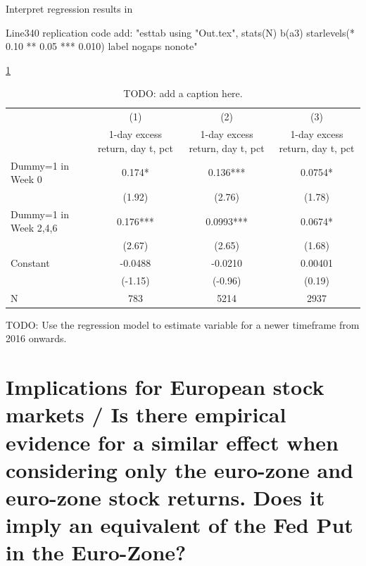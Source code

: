 Interpret regression results in  \parencite{cieslak_stock_2019}

Line340 replication code add:
"esttab using "Out.tex", stats(N) b(a3) starlevels(*  0.10 ** 0.05 *** 0.010) label nogaps nonote"

{


\ref{table_cies19_1}
\begin{table}
\begin{center}
\begin{adjustbox}{width=1\textwidth}
\def\sym#1{\ifmmode^{#1}\else\(^{#1}\)\fi}
\begin{tabular}{l*{3}{c}}

\hline\hline
                    &\multicolumn{1}{c}{(1)}&\multicolumn{1}{c}{(2)}&\multicolumn{1}{c}{(3)}\\
                    &\multicolumn{1}{c}{1-day excess return, day t, pct}&\multicolumn{1}{c}{1-day excess return, day t, pct}&\multicolumn{1}{c}{1-day excess return, day t, pct}\\
\hline
Dummy=1 in Week 0   &       0.174*  &       0.136***&      0.0754*  \\
                    &      (1.92)   &      (2.76)   &      (1.78)   \\
Dummy=1 in Week 2,4,6&       0.176***&      0.0993***&      0.0674*  \\
                    &      (2.67)   &      (2.65)   &      (1.68)   \\
Constant            &     -0.0488   &     -0.0210   &     0.00401   \\
                    &     (-1.15)   &     (-0.96)   &      (0.19)   \\
\hline
N                   &         783   &        5214   &        2937   \\
\hline\hline

\end{tabular}
\end{adjustbox}
\caption{\label{table_cies19_1}TODO: add a caption here.}
\end{center}
\end{table}

}




TODO: Use the regression model to estimate variable for a newer timeframe from 2016 onwards.

\chapter{Implications for European stock markets / Is there empirical evidence for a similar effect when considering only the euro-zone and euro-zone stock returns.  Does it imply an equivalent of the Fed Put in the Euro-Zone?}

